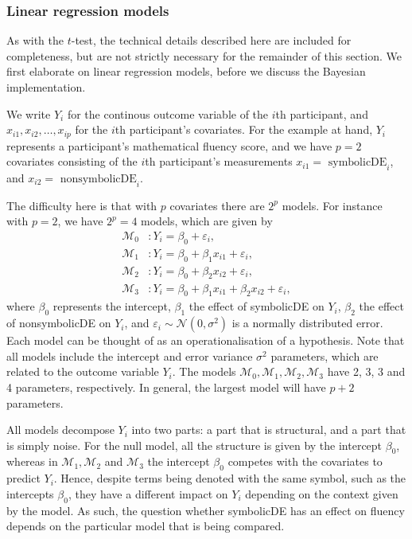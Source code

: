 \documentclass[english,,doc,floatsintext]{apa6}
\begin{document}
\hypertarget{linear-regression-models}{%
\subsubsection{Linear regression models}\label{linear-regression-models}}

As with the \(t\)-test, the technical details described here are included for completeness, but are not strictly necessary for the remainder of this section. We first elaborate on linear regression models, before we discuss the Bayesian implementation.

We write \(Y_{i}\) for the continous outcome variable of the \(i\)th participant, and \(x_{i1}, x_{i2}, \ldots, x_{ip}\) for the \(i\)th participant's covariates. For the example at hand, \(Y_{i}\) represents a participant's mathematical fluency score, and we have \(p=2\) covariates consisting of the \(i\)th participant's measurements \(x_{i1}=\text{ symbolicDE}_{i}\), and \(x_{i2}=\text{ nonsymbolicDE}_{i}\).

The difficulty here is that with \(p\) covariates there are \(2^{p}\) models. For instance with \(p=2\), we have \(2^{p} = 4\) models, which are given by
\begin{align*}
\mathcal{M}_{0} & : Y_{i} =\beta_{0} + \varepsilon_{i}, \\
\mathcal{M}_{1} & : Y_{i} =\beta_{0} + \beta_{1} x_{i1} + \varepsilon_{i}, \\
\mathcal{M}_{2} & : Y_{i} =\beta_{0} + \beta_{2} x_{i2} + \varepsilon_{i}, \\
\mathcal{M}_{3} & : Y_{i} =\beta_{0} + \beta_{1} x_{i1} + \beta_{2} x_{i2} + \varepsilon_{i},
\end{align*}
where \(\beta_{0}\) represents the intercept, \(\beta_{1}\) the effect of symbolicDE on \(Y_{i}\), \(\beta_{2}\) the effect of nonsymbolicDE on \(Y_{i}\), and \(\varepsilon_{i} \sim \mathcal{N}(0, \sigma^{2})\) is a normally distributed error. Each model can be thought of as an operationalisation of a hypothesis. Note that all models include the intercept and error variance \(\sigma^{2}\) parameters, which are related to the outcome variable \(Y_{i}\). The models \(\mathcal{M}_{0},\mathcal{M}_{1},\mathcal{M}_{2}, \mathcal{M}_{3}\) have 2, 3, 3 and 4 parameters, respectively. In general, the largest model will have \(p + 2\) parameters.

All models decompose \(Y_{i}\) into two parts: a part that is structural, and a part that is simply noise. For the null model, all the structure is given by the intercept \(\beta_{0}\), whereas in \(\mathcal{M}_{1}, \mathcal{M}_{2}\) and \(\mathcal{M}_{3}\) the intercept \(\beta_{0}\) competes with the covariates to predict \(Y_{i}\). Hence, despite terms being denoted with the same symbol, such as the intercepts \(\beta_{0}\), they have a different impact on \(Y_{i}\) depending on the context given by the model. As such, the question whether symbolicDE has an effect on fluency depends on the particular model that is being compared.
\end{document}
